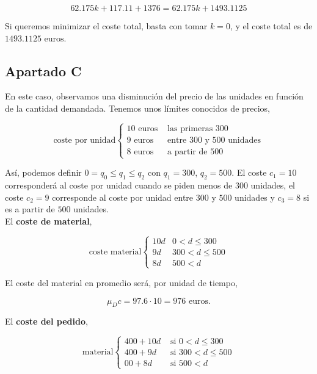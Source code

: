 \documentclass[a4paper,12pt]{article}
\begin{document}
$$ 62.175k + 117.11 + 1376 = 62.175k + 1493.1125$$

Si queremos minimizar el coste total, basta con tomar $k = 0 $, y el coste total es de $1493.1125 \text{ euros.}$

\pagebreak

\subsection{Apartado C}

En este caso, observamos una disminuci\'on del precio de las unidades en funci\'on de la cantidad demandada. Tenemos unos l\'imites conocidos de precios,
     
	\begin{equation*}
	\text{coste por unidad}  \left\lbrace \begin{array}{ll}	  
		10\text{ euros} & \text{ las primeras 300}\\
		9\text{ euros}  & \text{ entre 300 y 500 unidades}\\
		8\text{ euros}  & \text{ a partir de 500}
	\end{array}
	\right. 
	\end{equation*}
	
As\'i, podemos definir $0 = q_0 \leq q_1 \leq q_2$ con $q_1 = 300$, $q_2 = 500$. El coste $c_1 = 10$ corresponder\'a al coste por unidad cuando se piden menos de $300$ unidades, el coste $c_2 = 9$ corresponde al coste por unidad entre $300$ y $500$ unidades y $c_3 = 8$ si es a partir de $500$ unidades.\\

El \textbf{coste de material},

\begin{equation*}
\text{coste material} \left\lbrace \begin{array}{ll}
	10d & 0 < d \leq 300\\
	9d  & 300 < d \leq 500 \\
	8d  & 500 < d
\end{array}
	\right.
\end{equation*}

El coste del material en promedio ser\'a, por unidad de tiempo, 

$$ \mu_D c = 97.6 \cdot 10 = 976\text{ euros.}$$ 

El \textbf{coste del pedido},

\begin{equation*}
\text{material} \left\lbrace \begin{array}{ll}
	400 + 10d & \text{ si } 0 < d \leq 300\\
	400 + 9d  & \text{ si } 300 < d \leq 500 \\
	00 + 8d   & \text{ si } 500 < d
\end{array}
	\right.
\end{equation*}
\end{document}
